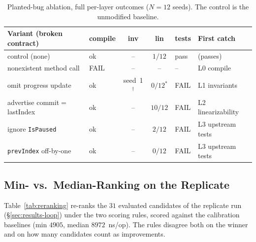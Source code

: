 \documentclass{article}
\begin{document}
\begin{table}[h]
  \caption{Planted-bug ablation, full per-layer outcomes ($N=12$
    seeds). The control is the unmodified baseline.}
  \label{tab:ablation-full}
  \centering
  \small
  \begin{tabular}{llccll}
    \toprule
    Variant (broken contract) & compile & inv & lin & tests & First catch \\
    \midrule
    control (none)                 & ok   & --    & $1/12$  & pass & (passes) \\
    nonexistent method call        & FAIL & --    & --      & --   & L0 compile \\
    omit progress update           & ok   & seed~1$^\dagger$ & $0/12^*$ & FAIL & L1 invariants \\
    advertise commit$=$lastIndex   & ok   & --    & $10/12$ & FAIL & L2 linearizability \\
    ignore \texttt{IsPaused}       & ok   & --    & $2/12$  & FAIL & L3 upstream tests \\
    \texttt{prevIndex} off-by-one  & ok   & --    & $0/12$  & FAIL & L3 upstream tests \\
    \bottomrule
  \end{tabular}
\end{table}

\subsection{Min- vs.\ Median-Ranking on the Replicate}
\label{app:reranking}
Table~\ref{tab:reranking} re-ranks the $31$ evaluated candidates of
the replicate run (\S\ref{sec:results-loop}) under the two scoring
rules, scored against the calibration baselines (min $4905$, median
$8972$~ns/op). The rules disagree both on the winner and on how many
candidates count as improvements.
\end{document}
